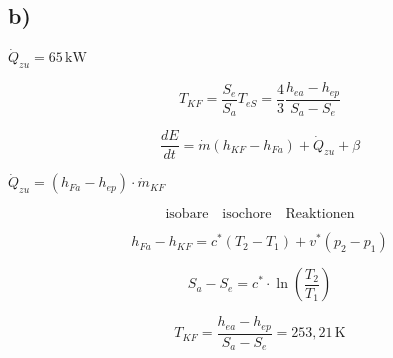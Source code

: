 

\subsection*{b)}
\(\dot{Q}_{zu} = 65 \, \text{kW}\)

\[
T_{KF} = \frac{S_e}{S_a} T_{eS} = \frac{4}{3} \frac{h_{ea} - h_{ep}}{S_a - S_e}
\]

\[
\frac{dE}{dt} = \dot{m} (h_{KF} - h_{Fa}) + \dot{Q}_{zu} + \beta
\]

\(\dot{Q}_{zu} = (h_{Fa} - h_{ep}) \cdot \dot{m}_{KF}\)

\[
\text{isobare} \quad \text{isochore} \quad \text{Reaktionen}
\]

\[
h_{Fa} - h_{KF} = c^* (T_2 - T_1) + v^* (p_2 - p_1)
\]

\[
S_a - S_e = c^* \cdot \ln \left( \frac{T_2}{T_1} \right)
\]

\[
T_{KF} = \frac{h_{ea} - h_{ep}}{S_a - S_e} = 253,21 \, \text{K}
\]